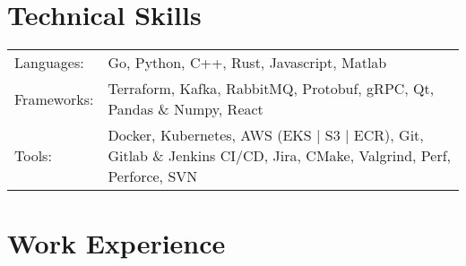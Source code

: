 \documentclass[a4paper,12pt]{article}
\begin{document}
\section{Technical Skills}
\begin{tabularx}{\linewidth}{@{}l X@{}}
Languages: &  \normalsize{Go, Python, C++, Rust, Javascript, Matlab}\\
Frameworks: & \normalsize{Terraform, Kafka, RabbitMQ, Protobuf, gRPC, Qt, Pandas \& Numpy, React}\\
Tools: & \normalsize{Docker, Kubernetes, AWS (EKS $|$ S3 $|$ ECR), Git, Gitlab \& Jenkins CI/CD, Jira, CMake, Valgrind, Perf, Perforce, SVN}\\
\end{tabularx}


\section{Work Experience}
\end{document}
